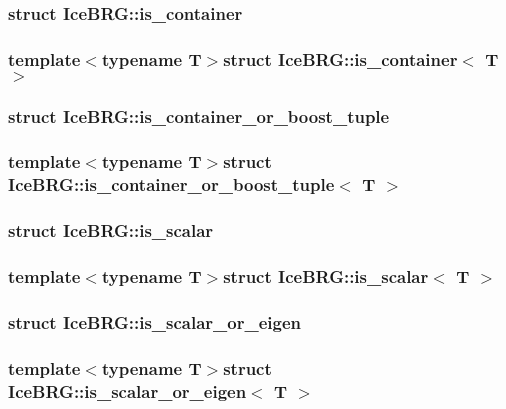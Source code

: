 \subsubsection{struct Ice\-B\-R\-G\-:\-:is\-\_\-container}
\subsubsection*{template$<$typename T$>$struct Ice\-B\-R\-G\-::is\-\_\-container$<$ T $>$}

\label{structIceBRG_1_1is__container__or__boost__tuple}
\hypertarget{namespaceIceBRG_structIceBRG_1_1is__container__or__boost__tuple}{}
\subsubsection{struct Ice\-B\-R\-G\-:\-:is\-\_\-container\-\_\-or\-\_\-boost\-\_\-tuple}
\subsubsection*{template$<$typename T$>$struct Ice\-B\-R\-G\-::is\-\_\-container\-\_\-or\-\_\-boost\-\_\-tuple$<$ T $>$}

\label{structIceBRG_1_1is__scalar}
\hypertarget{namespaceIceBRG_structIceBRG_1_1is__scalar}{}
\subsubsection{struct Ice\-B\-R\-G\-:\-:is\-\_\-scalar}
\subsubsection*{template$<$typename T$>$struct Ice\-B\-R\-G\-::is\-\_\-scalar$<$ T $>$}

\label{structIceBRG_1_1is__scalar__or__eigen}
\hypertarget{namespaceIceBRG_structIceBRG_1_1is__scalar__or__eigen}{}
\subsubsection{struct Ice\-B\-R\-G\-:\-:is\-\_\-scalar\-\_\-or\-\_\-eigen}
\subsubsection*{template$<$typename T$>$struct Ice\-B\-R\-G\-::is\-\_\-scalar\-\_\-or\-\_\-eigen$<$ T $>$}

